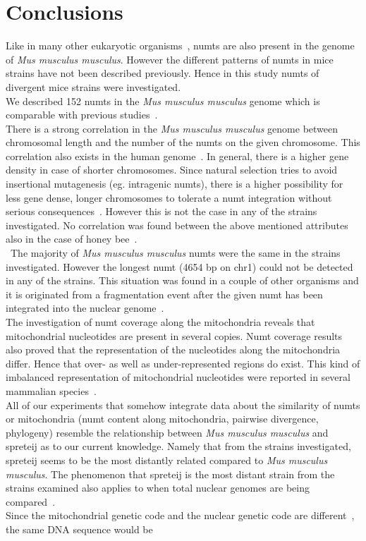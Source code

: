 \documentclass[a4paper,12pt]{article}
\numberwithin{equation}{section} %
\begin{document}
\section{Conclusions}
\indent Like in many other eukaryotic organisms~, numts are also present in the genome of  \textit{Mus musculus musculus}. However the different patterns of numts in mice strains have not been described previously. Hence in this study numts of  divergent mice strains were investigated.\\ \indent We described 152 numts in the \textit{Mus musculus musculus} genome which is comparable with previous studies~.\\ \indent There is a strong correlation in the \textit{Mus musculus musculus} genome between chromosomal length and the number of the numts on the given chromosome. This correlation also exists in the human genome~. In general, there is a higher gene density in case of shorter chromosomes. Since natural selection tries to avoid insertional mutagenesis (eg. intragenic numts), there is a higher possibility for less gene dense, longer chromosomes to tolerate a numt integration without serious consequences~. However this is not the case in any of the strains investigated. No correlation was found between the above mentioned attributes also in the case of honey bee~. \\ \indent The majority of \textit{Mus musculus musculus} numts were the same in the strains investigated. However the longest numt (4654 bp on chr1) could not be detected in any of the strains. This situation was found in a couple of other organisms and it is originated from a fragmentation event after the given numt has been integrated into the nuclear genome~.\\ \indent The investigation of numt coverage along the mitochondria reveals that mitochondrial nucleotides are present in several copies. Numt coverage results also proved that the representation of the nucleotides along the mitochondria differ. Hence that over- as well as under-represented regions do exist. This kind of imbalanced representation of mitochondrial nucleotides were reported in several mammalian species~.\\ \indent All of our experiments that somehow integrate data about the similarity of numts or mitochondria (numt content along mitochondria, pairwise divergence, phylogeny) resemble the relationship between \textit{Mus musculus musculus} and spreteij as to our current knowledge. Namely that from the strains investigated, spreteij seems to be the most distantly related compared to \textit{Mus musculus musculus}. The phenomenon that spreteij is the most distant strain from the strains examined also applies to when total nuclear genomes are being compared~.\\ \indent Since the mitochondrial genetic code and the nuclear genetic code are different~, the same DNA sequence would be 
\end{document}
